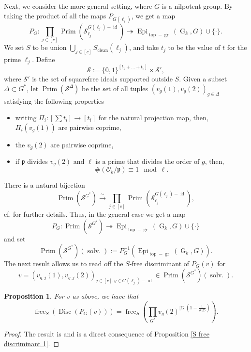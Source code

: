 \documentclass[11pt]{amsart}
\newtheorem{proposition}[theorem]{Proposition}
\newcommand{\p}{\mathfrak{p}}
\newcommand{\cO}{\mathcal{O}}
\newcommand{\op}[1]{\operatorname{#1}}
\numberwithin{equation}{section}
\begin{document}
\par Next, we consider the more general setting, where $G$ is a nilpotent group. By taking the product of all the maps $P_{G(\ell_j)}$, we get a map
\[P_G: \prod_{j\in [c]} \op{Prim}\left(\mathcal{S}_{\ell_j}^{G(\ell_j)-\op{id}}\right)\twoheadrightarrow \op{Epi}_{\op{top}-\op{gr}}\left(\op{G}_k, G\right)\cup \{\cdot\}.\]We set $S$ to be union $\bigcup_{j\in [c]} S_{\op{clean}}(\ell_j)$, and take $t_j$ to be the value of $t$ for the prime $\ell_j$. Define
\[\mathcal{S}:=\{0,1\}^{[t_1+\dots +t_c]}\times \mathcal{S}',\] where $\mathcal{S}'$ is the set of squarefree ideals supported outside $S$. Given a subset $\Delta\subset G^\ast$, let $\op{Prim}\left(\mathcal{S}^{\Delta}\right)$ be the set of all tuples $(v_g(1), v_g(2))_{g\in \Delta}$ satisfying the following properties
\begin{itemize}
    \item writing $\Pi_i: [\sum t_i]\rightarrow [t_i]$ for the natural projection map, then, $\Pi_i(v_g(1))$ are pairwise coprime,
    \item the $v_g(2)$ are pairwise coprime, 
    \item if $\p$ divides $v_g(2)$ and $\ell$ is a prime that divides the order of $g$, then, 
    \[\# \left(\cO_k/\p\right)\equiv 1\mod{\ell}. \]
\end{itemize}
\par There is a natural bijection 
\[\op{Prim}\left(\mathcal{S}^{G^\ast}\right)\xrightarrow{\sim} \prod_{j\in [c]} \op{Prim}\left(\mathcal{S}_{\ell_j}^{G(\ell_j)-\op{id}}\right), \] cf. \cite[p.326]{koymanspagano2023} for further details. Thus, in the general case we get a map 
\[P_G: \op{Prim}\left(\mathcal{S}^{G^\ast}\right)\twoheadrightarrow \op{Epi}_{\op{top}-\op{gr}}\left(\op{G}_k, G\right)\cup \{\cdot\}\] and set \[\op{Prim}\left(\mathcal{S}^{G^\ast}\right)(\op{solv.}):=P_G^{-1}\left(\op{Epi}_{\op{top}-\op{gr}}\left(\op{G}_k, G\right)\right).\] The next result allows us to read off the $S$-free discriminant of $P_G(v)$ for 
\begin{equation}\label{boring equation 1}v=(v_{g,j}(1), v_{g, j}(2))_{j\in [c], g\in G(\ell_j)-\op{id}}\in \op{Prim}\left(\mathcal{S}^{G^\ast}\right)(\op{solv.}).\end{equation}
\begin{proposition}\label{S clean discriminant main}
    For $v$ as above, we have that 
    \[\op{free}_S\left(\op{Disc}(P_G(v))\right)=\op{free}_S\left(\prod_{G^\ast} v_g(2)^{|G|\left(1-\frac{1}{\#\langle g\rangle}\right)}\right).\]
\end{proposition}
\begin{proof}
    The result is \cite[Proposition 2.13]{koymanspagano2023} and is a direct consequence of Proposition \ref{S free discriminant 1}.
\end{proof}
\end{document}
